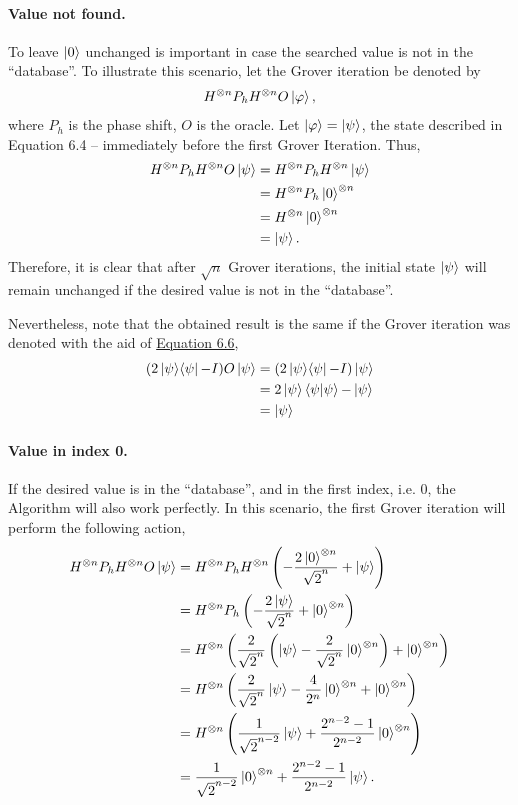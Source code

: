 \paragraph{Value not found.}
To leave $\ket0$ unchanged is important in case
the searched value is not in the ``database''.
To illustrate this scenario, let the Grover iteration be denoted by
\begin{align}
    H^{\otimes n} P_h H^{\otimes n} O \ket\varphi,
\end{align}
where $P_h$ is the phase shift, $O$ is the oracle.
Let $\ket\varphi = \ket\psi$, the state described in Equation 6.4 --
immediately before the first Grover Iteration.
Thus,
\begin{align}
    H^{\otimes n} P_h H^{\otimes n} O \ket\psi &=
        H^{\otimes n} P_h H^{\otimes n} \ket\psi \\
    &= H^{\otimes n} P_h \ket{0}^{\otimes n} \\
    &= H^{\otimes n} \ket{0}^{\otimes n} \\
    &= \ket\psi.
\end{align}
Therefore, it is clear that after $\sqrt{n}$ Grover iterations,
the initial state $\ket\psi$ will remain unchanged if
the desired value is not in the ``database''.

Nevertheless, note that the obtained result is the same if
the Grover iteration was denoted with the aid of
\hyperref[sec:nielsen-and-chuang-equation-6-6]{Equation 6.6},
\begin{align}
    (2 \mathop{\mathinner{ |{\psi}\rangle \langle{\psi}|}} - I) O \ket\psi &= (2 \mathop{\mathinner{ |{\psi}\rangle \langle{\psi}|}} - I) \ket\psi \\
    &= 2 \ket\psi \mathop{\mathinner{ \langle{\psi}|{\psi}\rangle}} - \ket\psi \\
    &= \ket\psi
\end{align}

\paragraph{Value in index 0.}
If the desired value is in the ``database'', and in the first index, i.e. 0,
the Algorithm will also work perfectly.
In this scenario, the first Grover iteration will perform the following action,
\begin{align}
    H^{\otimes n} P_h H^{\otimes n} O \ket\psi &=
        H^{\otimes n} P_h H^{\otimes n} \left(- \frac{2\ket{0}^{\otimes n}}{\sqrt{2}^n} + \ket\psi \right) \\
    &= H^{\otimes n} P_h \left(- \frac{2\ket\psi}{\sqrt{2}^n} + \ket{0}^{\otimes n} \right) \\
    &= H^{\otimes n} \left(\frac{2}{\sqrt{2}^n} \left(\ket\psi -
        \frac{2}{\sqrt{2}^n} \ket{0}^{\otimes n} \right) + \ket{0}^{\otimes n} \right) \\
    &= H^{\otimes n} \left( \frac{2}{\sqrt{2}^n}\ket\psi -\frac{4}{2^n}\ket{0}^{\otimes n} +
        \ket{0}^{\otimes n} \right) \\
    &= H^{\otimes n} \left( \frac{1}{\sqrt{2}^{n-2}}\ket\psi +
        \frac{2^{n-2} - 1}{2^{n-2}}\ket{0}^{\otimes n} \right) \\
    &= \frac{1}{\sqrt{2}^{n-2}}\ket{0}^{\otimes n} + \frac{2^{n-2} - 1}{2^{n-2}}\ket\psi.
\end{align}

